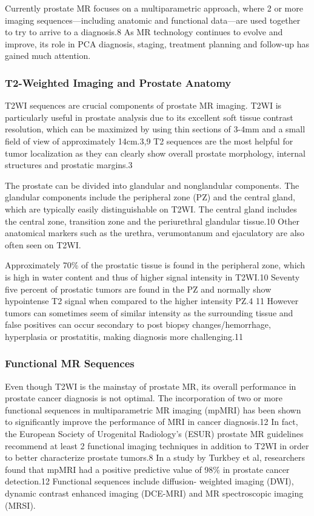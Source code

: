Currently prostate MR focuses on a multiparametric approach, where 2 or more
imaging sequences—including anatomic and functional data—are used together to
try to arrive to a diagnosis.8 As MR technology continues to evolve and
improve, its role in PCA diagnosis, staging, treatment planning and follow-up
has gained much attention.

\subsubsection{T2-Weighted Imaging and Prostate Anatomy}
T2WI sequences are crucial components of prostate MR imaging.  T2WI is
particularly useful in prostate analysis due to its excellent soft tissue
contrast resolution, which can be maximized by using thin sections of 3-4mm and
a small field of view of approximately 14cm.3,9 T2 sequences are the most
helpful for tumor localization as they can clearly show overall prostate
morphology, internal structures and prostatic margins.3

The prostate can be divided into glandular and nonglandular components. The
glandular components include the peripheral zone (PZ) and the central gland,
which are typically easily distinguishable on T2WI. The central gland includes
the central zone, transition zone and the periurethral glandular tissue.10
Other anatomical markers such as the urethra, verumontanum and ejaculatory are
also often seen on T2WI. 

Approximately 70\% of the prostatic tissue is found in the peripheral zone,
which is high in water content and thus of higher signal intensity in T2WI.10
Seventy five percent of prostatic tumors are found in the PZ and normally show
hypointense T2 signal when compared to the higher intensity PZ.4 11 However
tumors can sometimes seem of similar intensity as the surrounding tissue and
false positives can occur secondary to post biopsy changes/hemorrhage,
hyperplasia or prostatitis, making diagnosis more challenging.11 

\subsubsection{Functional MR Sequences}
Even though T2WI is the mainstay of prostate MR, its overall performance in
prostate cancer diagnosis is not optimal. The incorporation of two or more
functional sequences in multiparametric MR imaging (mpMRI) has been shown to
significantly improve the performance of MRI in cancer diagnosis.12 In fact,
the European Society of Urogenital Radiology’s (ESUR) prostate MR guidelines
recommend at least 2 functional imaging techniques in addition to T2WI in order
to better characterize prostate tumors.8 In a study by Turkbey et al,
researchers found that mpMRI had a positive predictive value of 98\% in
prostate cancer detection.12 Functional sequences include diffusion- weighted
imaging (DWI), dynamic contrast enhanced imaging (DCE-MRI) and MR spectroscopic
imaging (MRSI). 

